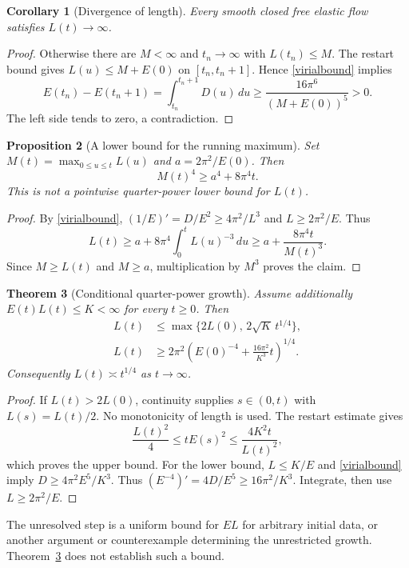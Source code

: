\documentclass[11pt,a4paper]{article}
\newtheorem{theorem}{Theorem}
\newtheorem{proposition}[theorem]{Proposition}
\newtheorem{corollary}[theorem]{Corollary}
\begin{document}
\begin{corollary}[Divergence of length]
Every smooth closed free elastic flow satisfies $L(t)\to\infty$.
\end{corollary}
\begin{proof}
Otherwise there are $M<\infty$ and $t_n\to\infty$ with $L(t_n)\le M$. The restart bound gives $L(u)\le M+E(0)$ on $[t_n,t_n+1]$. Hence \eqref{virialbound} implies
\[
 E(t_n)-E(t_n+1)=\int_{t_n}^{t_n+1}D(u)\,du
 \ge\frac{16\pi^6}{(M+E(0))^5}>0.
\]
The left side tends to zero, a contradiction.
\end{proof}

\begin{proposition}[A lower bound for the running maximum]
Set $M(t)=\max_{0\le u\le t}L(u)$ and $a=2\pi^2/E(0)$. Then
\[
 M(t)^4\ge a^4+8\pi^4t.
\]
This is not a pointwise quarter-power lower bound for $L(t)$.
\end{proposition}
\begin{proof}
By \eqref{virialbound}, $(1/E)'=D/E^2\ge4\pi^2/L^3$ and $L\ge2\pi^2/E$. Thus
\[
 L(t)\ge a+8\pi^4\int_0^tL(u)^{-3}\,du
 \ge a+\frac{8\pi^4t}{M(t)^3}.
\]
Since $M\ge L(t)$ and $M\ge a$, multiplication by $M^3$ proves the claim.
\end{proof}

\begin{theorem}[Conditional quarter-power growth]\label{conditional}
Assume additionally $E(t)L(t)\le K<\infty$ for every $t\ge0$. Then
\begin{align*}
 L(t)&\le\max\{2L(0),\,2\sqrt K\,t^{1/4}\},\\
 L(t)&\ge2\pi^2\left(E(0)^{-4}+\frac{16\pi^2}{K^3}t\right)^{1/4}.
\end{align*}
Consequently $L(t)\asymp t^{1/4}$ as $t\to\infty$.
\end{theorem}
\begin{proof}
If $L(t)>2L(0)$, continuity supplies $s\in(0,t)$ with $L(s)=L(t)/2$. No monotonicity of length is used. The restart estimate gives
\[
 \frac{L(t)^2}{4}\le tE(s)^2\le\frac{4K^2t}{L(t)^2},
\]
which proves the upper bound. For the lower bound, $L\le K/E$ and \eqref{virialbound} imply $D\ge4\pi^2E^5/K^3$. Thus $(E^{-4})'=4D/E^5\ge16\pi^2/K^3$. Integrate, then use $L\ge2\pi^2/E$.
\end{proof}
The unresolved step is a uniform bound for $EL$ for arbitrary initial data, or another argument or counterexample determining the unrestricted growth. Theorem~\ref{conditional} does not establish such a bound.
\end{document}
